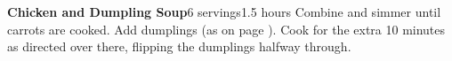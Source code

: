 \documentclass[../Cookbook.tex]{subfiles}
\begin{document}
\begin{recipe}[ChickenAndDumplingSoup]{\textbf{Chicken and Dumpling Soup}}{6 servings}{1.5 hours}
    Combine and simmer until carrots are cooked.
    Add dumplings (as on page \pageref{Dumplings}).
    Cook for the extra 10 minutes as directed over there, flipping the dumplings halfway through.
\end{recipe}
\end{document}
